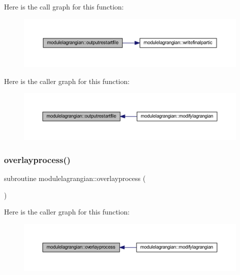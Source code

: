 Here is the call graph for this function\+:\nopagebreak
\begin{figure}[H]
\begin{center}
\leavevmode
\includegraphics[width=350pt]{namespacemodulelagrangian_aeabb1bf3ca49fb9ff017aaf38a5ad02b_cgraph}
\end{center}
\end{figure}
Here is the caller graph for this function\+:\nopagebreak
\begin{figure}[H]
\begin{center}
\leavevmode
\includegraphics[width=350pt]{namespacemodulelagrangian_aeabb1bf3ca49fb9ff017aaf38a5ad02b_icgraph}
\end{center}
\end{figure}
\mbox{\label{namespacemodulelagrangian_ac5c97cbe4a964c4bf8de40af414143c0}} 
\subsubsection{\texorpdfstring{overlayprocess()}{overlayprocess()}}
{\footnotesize\ttfamily subroutine modulelagrangian\+::overlayprocess (\begin{DoxyParamCaption}{ }\end{DoxyParamCaption})\hspace{0.3cm}{\ttfamily [private]}}

Here is the caller graph for this function\+:\nopagebreak
\begin{figure}[H]
\begin{center}
\leavevmode
\includegraphics[width=350pt]{namespacemodulelagrangian_ac5c97cbe4a964c4bf8de40af414143c0_icgraph}
\end{center}
\end{figure}
\mbox{\label{namespacemodulelagrangian_a7a7e141a39c3a112666d37b0f6db988e}} 
